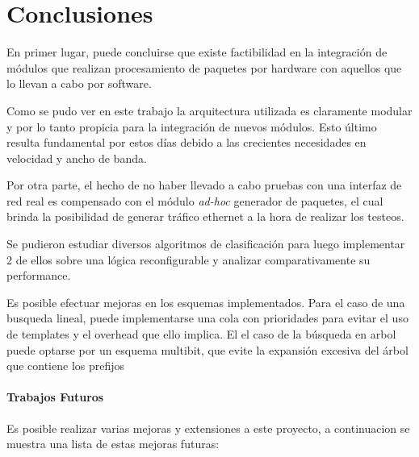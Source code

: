 \chapter{Conclusiones}

En primer lugar, puede concluirse que existe factibilidad en la integración de módulos que realizan procesamiento de paquetes por hardware con aquellos que lo llevan a cabo por software.

Como se pudo ver en este trabajo la arquitectura utilizada es claramente modular y por lo tanto propicia para la integración de nuevos módulos. Esto último resulta fundamental por estos días debido a las crecientes necesidades en velocidad y ancho de banda.

Por otra parte, el hecho de no haber llevado a cabo pruebas con una interfaz de red real es compensado con el módulo \textit{ad-hoc} generador de paquetes, el cual brinda la posibilidad de generar tráfico ethernet a la hora de realizar los testeos.

Se pudieron estudiar diversos algoritmos de clasificación para luego implementar 2 de ellos sobre una lógica reconfigurable y analizar comparativamente su performance.

Es posible efectuar mejoras en los esquemas implementados. Para el caso de una busqueda lineal, puede implementarse una cola con prioridades para evitar el uso de templates y el overhead que ello implica. El el caso de la búsqueda en arbol puede optarse por un esquema multibit, que evite la expansión excesiva del árbol que contiene los prefijos 

\subsubsection{Trabajos Futuros}

Es posible realizar varias mejoras y extensiones a este proyecto, a continuacion se muestra una lista de estas mejoras futuras:

\begin{itemize}

\end{itemize}






